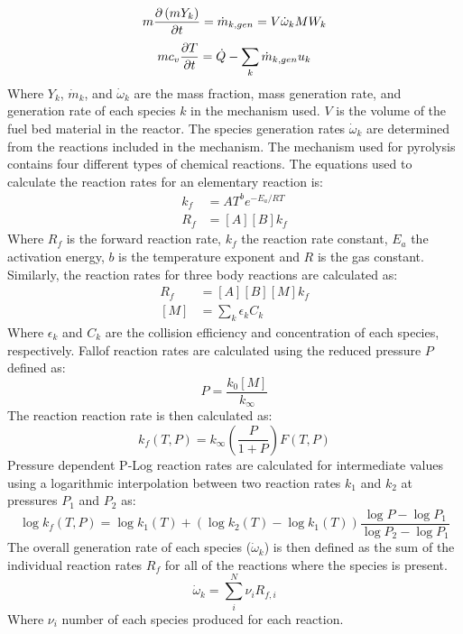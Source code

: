         \begin{equation}
            m \pder[\left( m Y_k \right)]{t} = \dot{m}_{k, gen} = V \dot{\omega}_k MW_k
        \end{equation}
        \begin{equation}
            mc_{v} \pder[T]{t} = \dot{Q} - \sum_{k} \dot{m}_{k,gen}u_k
        \end{equation}
    Where $Y_k$, $\dot{m}_{k}$, and  $\dot{\omega}_k$ are the mass fraction, mass generation rate, and generation rate of each species $k$ in the mechanism used. $V$ is the volume of the fuel bed material in the reactor. The species generation rates $ \dot{\omega}_k$ are determined from the reactions included in the mechanism. The mechanism used for pyrolysis contains four different types of chemical reactions. The equations used to calculate the reaction rates for an elementary reaction is:
        \begin{align}
            k_f &= AT^{b}e^{-E_a/RT}\\
            R_{f} &= [A][B]k_f 
        \end{align}
    Where $R_f$ is the forward reaction rate, $k_f$ the reaction rate constant, $E_a$ the activation energy, $b$ is the temperature exponent and $R$ is the gas constant. Similarly, the reaction rates for three body reactions are calculated as:
        \begin{align}
            R_f &= [A][B][M]k_f \\
            [M] &= \sum_{k}\epsilon_k C_k
        \end{align}
    Where $\epsilon_k$ and $C_k$ are the collision efficiency and concentration of each species, respectively. Fallof reaction rates are calculated using the reduced pressure $P$ defined as:
        \begin{equation}
            P = \frac{k_0[M]}{k_\infty}
        \end{equation}
    The reaction reaction rate is then calculated as:
        \begin{equation}
            k_f (T, P) = k_{\infty} \left( \frac{P}{1+P}\right) F(T,P)
        \end{equation}
      Pressure dependent P-Log reaction rates are calculated for intermediate values using a logarithmic interpolation between two reaction rates $k_1$ and $k_2$ at pressures $P_1$ and $P_2$ as:
        \begin{equation}
            \log k_f(T,P) = \log k_1(T) + (\log k_2(T) - \log k_1(T))\frac{\log P - \log P_1}{\log P_2 - \log P_1}
        \end{equation}
    The overall generation rate of each species ($\dot{\omega}_k$) is then defined as the sum of the individual reaction rates $R_f$ for all of the reactions where the species is present. 
        \begin{equation}
            \dot{\omega}_k = \sum_i^N \nu_i R_{f, i}
        \end{equation}
    Where $\nu_i$ number of each species produced for each reaction.
    
